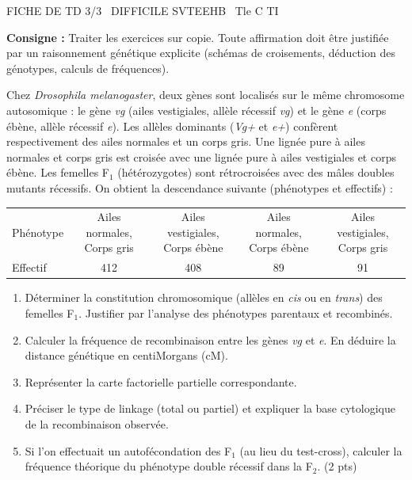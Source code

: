 \documentclass[11pt]{article}
\begin{document}
\begin{tcolorbox}[enhanced,colback=popink,colframe=popink,arc=10pt,boxrule=0pt,left=12pt,right=12pt,top=9pt,bottom=9pt]
{\color{white}\popxbold\small FICHE DE TD 3/3 \textbullet\ DIFFICILE \hfill SVTEEHB \textbullet\ Tle C TI\par}
\end{tcolorbox}
\vspace{4pt}
\noindent \textbf{Consigne :} Traiter les exercices sur copie. Toute affirmation doit être justifiée par un raisonnement génétique explicite (schémas de croisements, déduction des génotypes, calculs de fréquences).

\begin{exercice}
Chez \textit{Drosophila melanogaster}, deux gènes sont localisés sur le même chromosome autosomique : le gène \textit{vg} (ailes vestigiales, allèle récessif \textit{vg}) et le gène \textit{e} (corps ébène, allèle récessif \textit{e}). Les allèles dominants (\textit{Vg+} et \textit{e+}) confèrent respectivement des ailes normales et un corps gris.
Une lignée pure à ailes normales et corps gris est croisée avec une lignée pure à ailes vestigiales et corps ébène. Les femelles F$_1$ (hétérozygotes) sont rétrocroisées avec des mâles doubles mutants récessifs.
On obtient la descendance suivante (phénotypes et effectifs) :
\begin{center}
\begin{tabular}{lcccc}
\hline
Phénotype & Ailes normales, Corps gris & Ailes vestigiales, Corps ébène & Ailes normales, Corps ébène & Ailes vestigiales, Corps gris \\
Effectif & 412 & 408 & 89 & 91 \\
\hline
\end{tabular}
\end{center}
\begin{enumerate}
\item Déterminer la constitution chromosomique (allèles en \textit{cis} ou en \textit{trans}) des femelles F$_1$. Justifier par l'analyse des phénotypes parentaux et recombinés.
\item Calculer la fréquence de recombinaison entre les gènes \textit{vg} et \textit{e}. En déduire la distance génétique en centiMorgans (cM).
\item Représenter la carte factorielle partielle correspondante.
\item Préciser le type de linkage (total ou partiel) et expliquer la base cytologique de la recombinaison observée.
\item Si l'on effectuait un autofécondation des F$_1$ (au lieu du test-cross), calculer la fréquence théorique du phénotype double récessif dans la F$_2$. (2 pts)
\end{enumerate}
\end{exercice}
\end{document}
